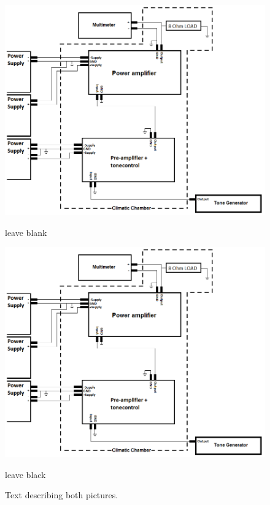 \begin{figure}[H]
	\hfill
	{%
		\begin{minipage}{0.46\linewidth}
			\includegraphics[width=\linewidth]{figures/zExamples/filename}
			\caption{leave blank} %
			\label{fig:Picture1}
		\end{minipage}
	}\hfill
	{%
		\begin{minipage}{0.46\linewidth}
			\includegraphics[width=\linewidth]{figures/zExamples/filename}
			\caption{leave black} %
			\label{fig:Picture2}
		\end{minipage}
	}%
	\caption{Text describing both pictures.}
\end{figure}



